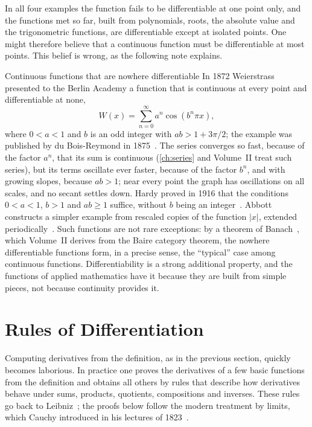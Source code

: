 In all four examples the function fails to be differentiable at one point only, and the functions met so far, built from polynomials, roots, the absolute value and the trigonometric functions, are differentiable except at isolated points. One might therefore believe that a continuous function must be differentiable at most points. This belief is wrong, as the following note explains.

\begin{note}{Continuous functions that are nowhere differentiable}
In 1872 Weierstrass presented to the Berlin Academy a function that is continuous at every point and differentiable at none,
\[
W(x)=\sum_{n=0}^\infty a^n\cos(b^n\pi x),
\]
where $0<a<1$ and $b$ is an odd integer with $ab>1+3\pi/2$; the example was published by du Bois-Reymond in 1875~\cite{duboisreymond1875}. The series converges so fast, because of the factor $a^n$, that its sum is continuous (\cref{ch:series} and Volume~II treat such series), but its terms oscillate ever faster, because of the factor $b^n$, and with growing slopes, because $ab>1$; near every point the graph has oscillations on all scales, and no secant settles down. Hardy proved in 1916 that the conditions $0<a<1$, $b>1$ and $ab\ge1$ suffice, without $b$ being an integer~\cite{hardy1916}. Abbott constructs a simpler example from rescaled copies of the function $|x|$, extended periodically~\cite{abbott2015}. Such functions are not rare exceptions: by a theorem of Banach~\cite{banach1931}, which Volume~II derives from the Baire category theorem, the nowhere differentiable functions form, in a precise sense, the ``typical'' case among continuous functions. Differentiability is a strong additional property, and the functions of applied mathematics have it because they are built from simple pieces, not because continuity provides it.
\end{note}

\section{Rules of Differentiation}
\label{sec:rules}

Computing derivatives from the definition, as in the previous section, quickly becomes laborious. In practice one proves the derivatives of a few basic functions from the definition and obtains all others by rules that describe how derivatives behave under sums, products, quotients, compositions and inverses. These rules go back to Leibniz~\cite{leibniz1684}; the proofs below follow the modern treatment by limits, which Cauchy introduced in his lectures of 1823~\cite{cauchy1823,grabiner1981}.

